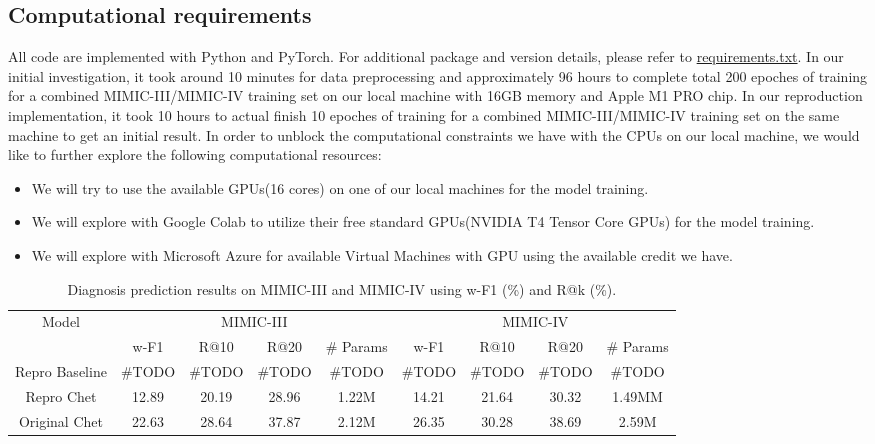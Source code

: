 \documentclass[11pt,a4paper,fleqn]{article}
\begin{document}
\subsection{Computational requirements}
All code are implemented with Python and PyTorch. For additional package and
version details, please refer to
\href{https://github.com/willtsai/dlh-sp23-team53/blob/main/requirements.txt}{requirements.txt}.
In our initial investigation, it took around 10 minutes for data preprocessing
and approximately 96 hours to complete total 200 epoches of training for a
combined MIMIC-III/MIMIC-IV training set on our local machine with 16GB memory
and Apple M1 PRO chip. In our reproduction implementation, it took 10 hours to
actual finish 10 epoches of training for a combined MIMIC-III/MIMIC-IV training
set on the same machine to get an initial result. In order to unblock the
computational constraints we have with the CPUs on our local machine, we would
like to further explore the following computational resources:
\begin{itemize}
  \item We will try to use the available GPUs(16 cores) on one of our local
  machines for the model training.
  \item We will explore with Google Colab to utilize their free standard
  GPUs(NVIDIA T4 Tensor Core GPUs) for the model training.
  \item We will explore with Microsoft Azure for available Virtual Machines with
  GPU using the available credit we have.
\end{itemize}

\begin{table*}[ht]
  \centering
  \begin{tabular}{|ccccc|cccc|} \hline
    {Model} & \multicolumn{4}{c|}{MIMIC-III} & \multicolumn{4}{c|}{MIMIC-IV} \\
    \cline{2-9} & w-F1 & R@10 & R@20 & \# Params & w-F1 & R@10 & R@20 & \#
    Params \\ \hline
    {Repro Baseline} & \#TODO & \#TODO & \#TODO & \#TODO & \#TODO & \#TODO &
    \#TODO & \#TODO \\ \cline{1-9} {Repro Chet} & 12.89 & 20.19 & 28.96 & 1.22M
    & 14.21 & 21.64 & 30.32 & 1.49MM \\ \cline{1-9} {Original Chet} & 22.63 &
    28.64 & 37.87 & 2.12M & 26.35 & 30.28 & 38.69 & 2.59M \\ \cline{1-9}
  \end{tabular}
  \caption{Diagnosis prediction results on MIMIC-III and MIMIC-IV using w-F1 (\%) and R@k (\%).}
  \label{tab:diag}
  \end{table*}
\end{document}
